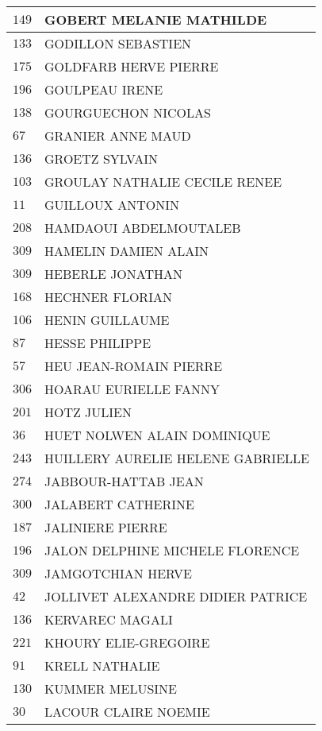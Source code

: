 \begin{xltabular}{\linewidth}{|l|X|}
    \hline
    $149$ & GOBERT MELANIE MATHILDE \\
    \hline
    $133$ & GODILLON SEBASTIEN \\
    \hline
    $175$ & GOLDFARB HERVE PIERRE \\
    \hline
    $196$ & GOULPEAU IRENE \\
    \hline
    $138$ & GOURGUECHON NICOLAS \\
    \hline
    $67$ & GRANIER ANNE MAUD \\
    \hline
    $136$ & GROETZ SYLVAIN \\
    \hline
    $103$ & GROULAY NATHALIE CECILE RENEE \\
    \hline
    $11$ & GUILLOUX ANTONIN \\
    \hline
    $208$ & HAMDAOUI ABDELMOUTALEB \\
    \hline
    $309$ & HAMELIN DAMIEN ALAIN \\
    \hline
    $309$ & HEBERLE JONATHAN \\
    \hline
    $168$ & HECHNER FLORIAN \\
    \hline
    $106$ & HENIN GUILLAUME \\
    \hline
    $87$ & HESSE PHILIPPE \\
    \hline
    $57$ & HEU JEAN-ROMAIN PIERRE \\
    \hline
    $306$ & HOARAU EURIELLE FANNY \\
    \hline
    $201$ & HOTZ JULIEN \\
    \hline
    $36$ & HUET NOLWEN ALAIN DOMINIQUE \\
    \hline
    $243$ & HUILLERY AURELIE HELENE GABRIELLE \\
    \hline
    $274$ & JABBOUR-HATTAB JEAN \\
    \hline
    $300$ & JALABERT CATHERINE \\
    \hline
    $187$ & JALINIERE PIERRE \\
    \hline
    $196$ & JALON DELPHINE MICHELE FLORENCE \\
    \hline
    $309$ & JAMGOTCHIAN HERVE \\
    \hline
    $42$ & JOLLIVET ALEXANDRE DIDIER PATRICE \\
    \hline
    $136$ & KERVAREC MAGALI \\
    \hline
    $221$ & KHOURY ELIE-GREGOIRE \\
    \hline
    $91$ & KRELL NATHALIE \\
    \hline
    $130$ & KUMMER MELUSINE \\
    \hline
    $30$ & LACOUR CLAIRE NOEMIE \\

\end{xltabular}

